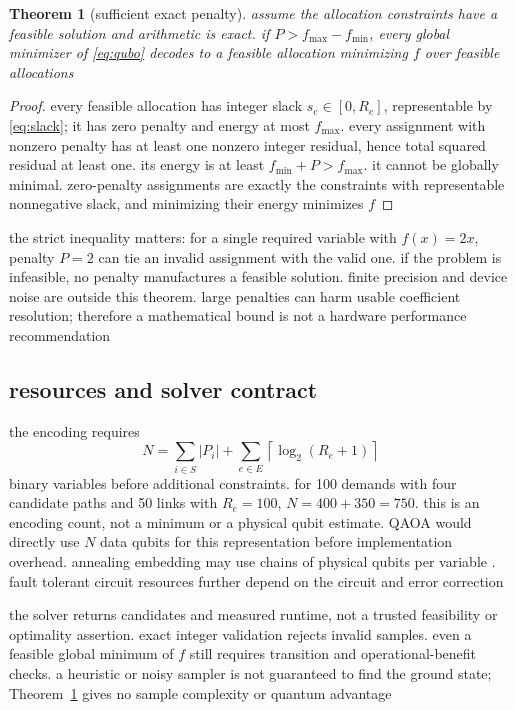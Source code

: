\documentclass[11pt,a4paper]{article}
\newtheorem{theorem}{Theorem}
\newcommand{\1}{\mathbf{1}}
\begin{document}
\begin{theorem}[sufficient exact penalty]\label{thm:qubo}
assume the allocation constraints have a feasible solution and arithmetic is exact. if $P>f_{\max}-f_{\min}$, every global minimizer of \eqref{eq:qubo} decodes to a feasible allocation minimizing $f$ over feasible allocations
\end{theorem}
\begin{proof}
every feasible allocation has integer slack $s_e\in[0,R_e]$, representable by \eqref{eq:slack}; it has zero penalty and energy at most $f_{\max}$. every assignment with nonzero penalty has at least one nonzero integer residual, hence total squared residual at least one. its energy is at least $f_{\min}+P>f_{\max}$. it cannot be globally minimal. zero-penalty assignments are exactly the constraints with representable nonnegative slack, and minimizing their energy minimizes $f$
\end{proof}
the strict inequality matters: for a single required variable with $f(x)=2x$, penalty $P=2$ can tie an invalid assignment with the valid one. if the problem is infeasible, no penalty manufactures a feasible solution. finite precision and device noise are outside this theorem. large penalties can harm usable coefficient resolution; therefore a mathematical bound is not a hardware performance recommendation

\subsection{resources and solver contract}
the encoding requires
\begin{equation}
 N=\sum_{i\in S}|P_i|+\sum_{e\in E}\left\lceil\log_2(R_e+1)\right\rceil\label{eq:n}
\end{equation}
binary variables before additional constraints. for 100 demands with four candidate paths and 50 links with $R_e=100$, $N=400+350=750$. this is an encoding count, not a minimum or a physical qubit estimate. QAOA would directly use $N$ data qubits for this representation before implementation overhead. annealing embedding may use chains of physical qubits per variable \cite{embedding}. fault tolerant circuit resources further depend on the circuit and error correction

the solver returns candidates and measured runtime, not a trusted feasibility or optimality assertion. exact integer validation rejects invalid samples. even a feasible global minimum of $f$ still requires transition and operational-benefit checks. a heuristic or noisy sampler is not guaranteed to find the ground state; Theorem~\ref{thm:qubo} gives no sample complexity or quantum advantage
\end{document}
